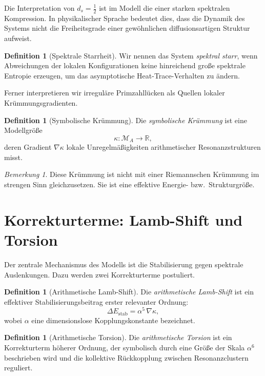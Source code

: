\documentclass[11pt,a4paper]{article}
\theoremstyle{plain}
\theoremstyle{definition}
\newtheorem{definition}[satz]{Definition}
\theoremstyle{remark}
\newtheorem{bemerkung}[satz]{Bemerkung}
\newcommand{\RR}{\mathbb{R}}
\newcommand{\grad}{\nabla}
\newcommand{\MA}{\mathcal{M}_A}
\newcommand{\kappaF}{\kappa}
\begin{document}
	Die Interpretation von $d_s=\tfrac12$ ist im Modell die einer starken spektralen Kompression. In physikalischer Sprache bedeutet dies, dass die Dynamik des Systems nicht die Freiheitsgrade einer gewöhnlichen diffusionsartigen Struktur aufweist.
	
	\begin{definition}[Spektrale Starrheit]
		Wir nennen das System \emph{spektral starr}, wenn Abweichungen der lokalen Konfigurationen keine hinreichend große spektrale Entropie erzeugen, um das asymptotische Heat-Trace-Verhalten zu ändern.
	\end{definition}
	
	Ferner interpretieren wir irreguläre Primzahllücken als Quellen lokaler Krümmungsgradienten.
	
	\begin{definition}[Symbolische Krümmung]
		Die \emph{symbolische Krümmung} ist eine Modellgröße
		\[
		\kappaF : \MA \to \RR,
		\]
		deren Gradient $\grad \kappaF$ lokale Unregelmäßigkeiten arithmetischer Resonanzstrukturen misst.
	\end{definition}
	
	\begin{bemerkung}
		Diese Krümmung ist nicht mit einer Riemannschen Krümmung im strengen Sinn gleichzusetzen. Sie ist eine effektive Energie- bzw.\ Strukturgröße.
	\end{bemerkung}
	
	\section{Korrekturterme: Lamb-Shift und Torsion}
	
	Der zentrale Mechanismus des Modells ist die Stabilisierung gegen spektrale Auslenkungen. Dazu werden zwei Korrekturterme postuliert.
	
	\begin{definition}[Arithmetische Lamb-Shift]
		Die \emph{arithmetische Lamb-Shift} ist ein effektiver Stabilisierungsbeitrag erster relevanter Ordnung:
		\[
		\Delta E_{\mathrm{stab}}=\alpha^5 \,\grad \kappaF,
		\]
		wobei $\alpha$ eine dimensionslose Kopplungskonstante bezeichnet.
	\end{definition}
	
	\begin{definition}[Arithmetische Torsion]
		Die \emph{arithmetische Torsion} ist ein Korrekturterm höherer Ordnung, der symbolisch durch eine Größe der Skala $\alpha^6$ beschrieben wird und die kollektive Rückkopplung zwischen Resonanzclustern reguliert.
	\end{definition}
	
\end{document}
